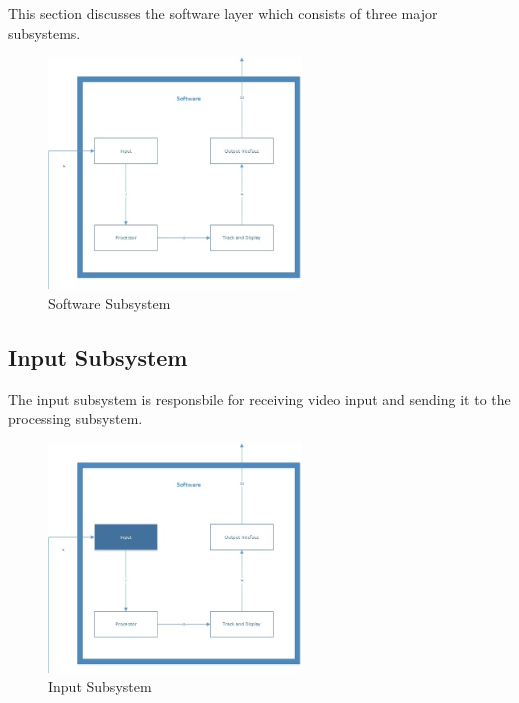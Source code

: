 This section discusses the software layer which consists of three major subsystems. 

\begin{figure}[h!]
	\centering
 	\includegraphics[width=0.60\textwidth]{images/Software.jpg}
 \caption{Software Subsystem}
\end{figure}

\subsection{Input Subsystem}
The input subsystem is responsbile for receiving video input and sending it to the processing subsystem.

\begin{figure}[h!]
	\centering
 	\includegraphics[width=0.60\textwidth]{images/Software_Input.jpg}
 \caption{Input Subsystem}
\end{figure}

